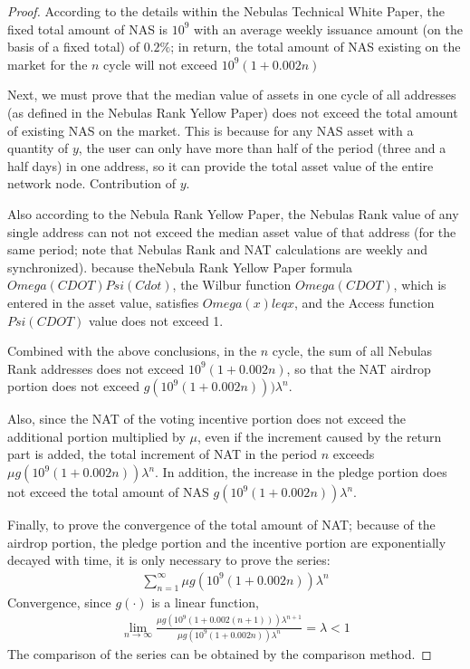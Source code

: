 \begin{proof}
	According to the details within the Nebulas Technical White Paper, the fixed total amount of NAS is $10^9$ with an average weekly issuance amount (on the basis of a fixed total) of $0.2\%$; in return, the total amount of NAS existing on the market for the $n$ cycle will not exceed $10^9 (1+0.002n) $
	
	Next, we must prove that the median value of assets in one cycle of all addresses (as defined in the Nebulas Rank Yellow Paper) does not exceed the total amount of existing NAS on the market. This is because for any NAS asset with a quantity of $y$, the user can only have more than half of the period (three and a half days) in one address, so it can provide the total asset value of the entire network node. Contribution of $y$.
	
	Also according to the Nebula Rank Yellow Paper, the Nebulas Rank value of any single address can not not exceed the median asset value of that address (for the same period; note that Nebulas Rank and NAT calculations are weekly and synchronized). because theNebula Rank Yellow Paper formula $Omega(CDOT)Psi(Cdot)$, the Wilbur function $Omega(CDOT)$, which is entered in the asset value, satisfies $Omega (x) leq x$, and the Access function $Psi(CDOT)$ value does not exceed 1.
	
	Combined with the above conclusions, in the $n$ cycle, the sum of all Nebulas Rank addresses does not exceed $10^9(1+0.002n)$, so that the NAT airdrop portion does not exceed $g(10^9(1+0.002n)))\lambda^n$.
	
	Also, since the NAT of the voting incentive portion does not exceed the additional portion multiplied by $\mu$, even if the increment caused by the return part is added, the total increment of NAT in the period $n$ exceeds $\mu g(10^9( 1+0.002n))\lambda^n$. In addition, the increase in the pledge portion does not exceed the total amount of NAS $g (10^9(1+0.002n))\lambda^n$.
	
	Finally, to prove the convergence of the total amount of NAT; because of the airdrop portion, the pledge portion and the incentive portion are exponentially decayed with time, it is only necessary to prove the series:
	\begin{align}
	\sum_{n=1}^{\infty} \mu g(10^9(1+0.002n))\lambda^n
	\end{align}
	Convergence, since $g(\cdot)$ is a linear function,
	\begin{align}
	\lim_{n\rightarrow \infty} \frac{\mu g(10^9(1+0.002(n+1)))\lambda^{n+1}}{\mu g(10^9(1+ 0.002n))\lambda^n} = \lambda <1
	\end{align}
	The comparison of the series can be obtained by the comparison method.
\end{proof}

